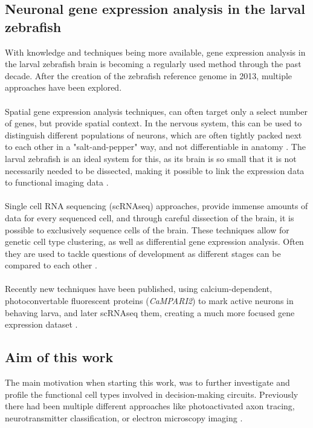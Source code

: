 \documentclass[12pt, a4paper, oneside]{article}
\begin{document}
\subsection{Neuronal gene expression analysis in the larval zebrafish}
\label{sec:intro genex}
With knowledge and techniques being more available, gene expression analysis in the larval zebrafish brain is becoming a regularly used method through the past decade. After the creation of the zebrafish reference genome \parencite{howeZebrafishReferenceGenome2013} in 2013, multiple approaches have been explored.\\
\\
Spatial gene expression analysis techniques, can often target only a select number of genes, but provide spatial context. In the nervous system, this can be used to distinguish different populations of neurons, which are often tightly packed next to each other in a "salt-and-pepper" way, and not differentiable in anatomy \parencite{shainerSinglecellResolutionGene2023, MapZebrain}. The larval zebrafish is an ideal system for this, as its brain is so small that it is not necessarily needed to be dissected, making it possible to link the expression data to functional imaging data \parencite{marquez-legorretaWholeBrainCoMappingGene2026}.\\
\\
Single cell RNA sequencing (scRNAseq) approaches, provide immense amounts of data for every sequenced cell, and through careful dissection of the brain, it is possible to exclusively sequence cells of the brain. These techniques allow for genetic cell type clustering, as well as differential gene expression analysis. Often they are used to tackle questions of development as different stages can be compared to each other \parencite{tambaloSingleCellTranscriptome2020, rajEmergenceNeuronalDiversity2020}.\\
\\
Recently new techniques have been published, using calcium-dependent, photoconvertable fluorescent proteins (\textit{CaMPARI2}) to mark active neurons in behaving larva, and later scRNAseq them, creating a much more focused gene expression dataset \parencite{matsudaMolecularFunctionalDissection2026, mayselessOdorPreferenceMaps2026}. 

\subsection{Aim of this work}
The main motivation when starting this work, was to further investigate and profile the functional cell types involved in decision-making circuits. Previously there had been multiple different approaches like photoactivated axon tracing, neurotransmitter classification, or electron microscopy imaging \parencite{boulanger-weillCorrelativeLightElectron2025, slangewalVisuomotorDecisionmakingMultifeature2026}.\\
\end{document}
